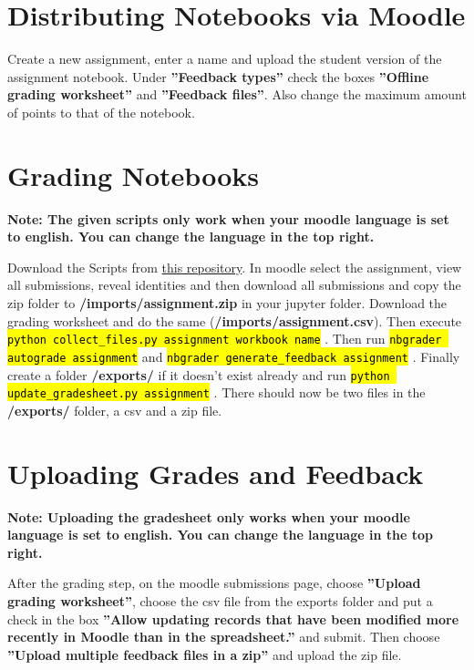 \documentclass{article}
\newcommand{\consolecommand}[1]{
\begingroup%
  \sethlcolor{cmd}%
  \hl{\texttt{#1}}%
\endgroup}
\newcommand{\clickthis}[1]{\textbf{''#1''}}
\newcommand{\pathfmt}[1]{\textbf{#1}}
\begin{document}
	\section{Distributing Notebooks via Moodle}
		Create a new assignment, enter a name and upload the student version of the assignment notebook. Under \clickthis{Feedback types} check the boxes \clickthis{Offline grading worksheet} and \clickthis{Feedback files}. Also change the maximum amount of points to that of the notebook.
	\section{Grading Notebooks}
		\textbf{Note: The given scripts only work when your moodle language is set to english. You can change the language in the top right.}

		Download the Scripts from \href{https://github.com/johnhw/moodle_nbgrader}{this repository}. In moodle select the assignment, view all submissions, reveal identities and then download all submissions and copy the zip folder to \pathfmt{/imports/\textlangle{}assignment\textrangle{}.zip} in your jupyter folder. Download the grading worksheet and do the same (\pathfmt{/imports/\textlangle{}assignment\textrangle{}.csv}). Then execute \consolecommand{python collect\_files.py \textlangle{}assignment\textrangle{} \textlangle{}workbook name\textrangle{}}. Then run \consolecommand{nbgrader autograde \textlangle{}assignment\textrangle{}} and \consolecommand{nbgrader generate\_feedback \textlangle{}assignment\textrangle{}}. Finally create a folder \pathfmt{/exports/} if it doesn't exist already and run \consolecommand{python update\_gradesheet.py \textlangle{}assignment\textrangle{}}. There should now be two files in the \pathfmt{/exports/} folder, a csv and a zip file.
	\section{Uploading Grades and Feedback}
		\textbf{Note: Uploading the gradesheet only works when your moodle language is set to english. You can change the language in the top right.}

		After the grading step, on the moodle submissions page, choose \clickthis{Upload grading worksheet}, choose the csv file from the exports folder and put a check in the box \clickthis{Allow updating records that have been modified more recently in Moodle than in the spreadsheet.} and submit. Then choose \clickthis{Upload multiple feedback files in a zip} and upload the zip file.
	\clearpage
\end{document}
